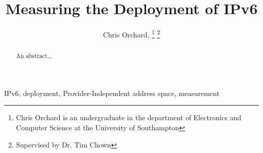 \documentclass[final, technote, a4paper]{IEEEtran}
\begin{document}
\title{Measuring the Deployment of IPv6}

\author{Chris Orchard,
\thanks{Chris Orchard is an undergraduate in the department of Electronics and
Computer Science at the University of Southampton} 
\thanks{Supervised by Dr. Tim Chown}
}


\maketitle

\begin{abstract}
An abstract...
\end{abstract}

\begin{IEEEkeywords}
IPv6, deployment, Provider-Independent address space, measurement
\end{IEEEkeywords}









{}
\end{document}
